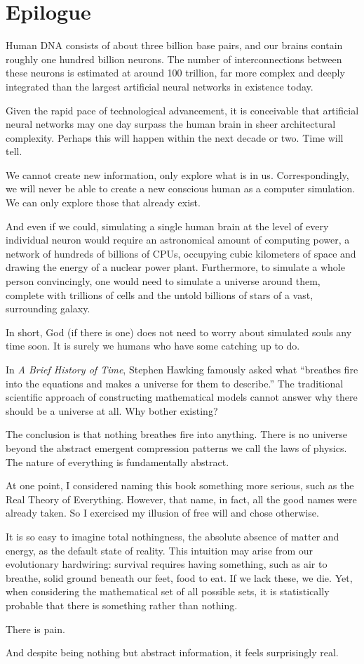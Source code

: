 \chapter{Epilogue}
\label{chap:epilogue}

Human DNA consists of about three billion base pairs, and our brains contain roughly one hundred billion neurons.
The number of interconnections between these neurons is estimated at around 100 trillion, far more complex and deeply integrated than the largest artificial neural networks in existence today.

Given the rapid pace of technological advancement, it is conceivable that artificial neural networks may one day surpass the human brain in sheer architectural complexity.
Perhaps this will happen within the next decade or two.
Time will tell.

We cannot create new information, only explore what is in us. 
Correspondingly, we will never be able to create a new conscious human as a computer simulation. 
We can only explore those that already exist.

And even if we could, simulating a single human brain at the level of every individual neuron would require an astronomical amount of computing power, a network of hundreds of billions of CPUs, occupying cubic kilometers of space and drawing the energy of a nuclear power plant.
Furthermore, to simulate a whole person convincingly, one would need to simulate a universe around them, complete with trillions of cells and the untold billions of stars of a vast, surrounding galaxy.

In short, God (if there is one) does not need to worry about simulated souls any time soon.
It is surely we humans who have some catching up to do.

In \textit{A Brief History of Time}, Stephen Hawking famously asked what ``breathes fire into the equations and makes a universe for them to describe.''
The traditional scientific approach of constructing mathematical models cannot answer why there should be a universe at all.
Why bother existing?

The conclusion is that nothing breathes fire into anything.
There is no universe beyond the abstract emergent compression patterns we call the laws of physics.
The nature of everything is fundamentally abstract.

At one point, I considered naming this book something more serious, such as the Real Theory of Everything.
However, that name, in fact, all the good names were already taken. So I exercised my illusion of free will and chose otherwise.

It is so easy to imagine total nothingness, the absolute absence of matter and energy, as the default state of reality.
This intuition may arise from our evolutionary hardwiring: survival requires having something, such as air to breathe, solid ground beneath our feet, food to eat.
If we lack these, we die.
Yet, when considering the mathematical set of all possible sets, it is statistically probable that there is something rather than nothing.

There is pain.

And despite being nothing but abstract information, it feels surprisingly real.

